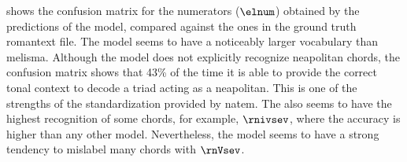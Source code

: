 
 shows the confusion
matrix for the numerators ($\elnum$) obtained by the
predictions of the \textcite{chen2021attend} model, compared
against the ones in the ground truth \gls{romantext} file.
The \textcite{chen2021attend} model seems to have a
noticeably larger vocabulary than \gls{melisma}. Although
the model does not explicitly recognize \gls{neapolitan}
chords, the confusion matrix shows that 43\% of the time it
is able to provide the correct tonal context to decode a
triad acting as a \gls{neapolitan}. This is one of the
strengths of the standardization provided by \gls{natem}.
The \textcite{chen2021attend} also seems to have the highest
recognition of some chords, for example, $\rnivsev$, where
the accuracy is higher than any other model. Nevertheless,
the model seems to have a strong tendency to mislabel many
chords with $\rnVsev$.

